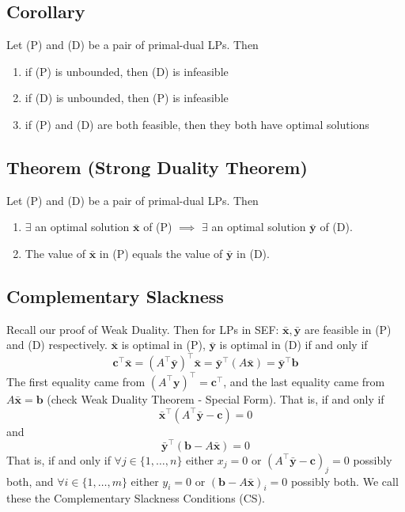\begin{thmbox}
    \subsection{Corollary}
    Let (P) and (D) be a pair of primal-dual LPs. Then
    \begin{enumerate}[(1)]
        \item if (P) is unbounded, then (D) is infeasible
        \item if (D) is unbounded, then (P) is infeasible
        \item if (P) and (D) are both feasible, then they both
        have optimal solutions
    \end{enumerate}
\end{thmbox}

\begin{thmbox}
    \subsection{Theorem (Strong Duality Theorem)}
    Let (P) and (D) be a pair of primal-dual LPs. Then
    \begin{enumerate}[(1)]
        \item $ \exists $ an optimal solution $ \bm{\bar{x}} $ of (P) $ \implies $ $\exists$ an optimal solution $ \bm{\bar{y}} $ of (D).
        \item The value of $ \bm{\bar{x}} $ in (P) equals the value of $ \bm{\bar{y}} $ in (D).
    \end{enumerate}
\end{thmbox}

\subsection{Complementary Slackness}
Recall our proof of Weak Duality. Then for LPs in SEF: 
$ \bm{\bar{x}}, \bm{\bar{y}} $ are feasible in (P) and (D) respectively.
$ \bm{\bar{x}} $ is optimal in (P), $ \bm{\bar{y}} $ is optimal in
(D)  if and only if
\[ \bm{c} ^\top \bm{\bar{x}}=(A^\top \bm{\bar{y}})^\top \bm{\bar{x}}=\bm{\bar{y}}^\top(A \bm{\bar{x}})=
\bm{\bar{y}}^\top \bm{b} \]
The first equality came from $ (A ^\top \bm{y})^\top=\bm{c}^\top $, and the
last equality came from $ A \bm{\bar{x}}=\bm{b} $ (check Weak Duality Theorem -
Special Form).
That is, if and only if
\[ \bm{\bar{x}}^\top(A ^\top \bm{\bar{y}}-\bm{c})=0 \]
and
\[ \bm{\bar{y}}^\top(\bm{b}-A \bm{\bar{x}})=0 \]
That is, if and only if $ \forall j\in \{1,\ldots,n\} $ either
$ x_j=0 $ or $ (A ^\top \bm{\bar{y}}-\bm{c})_j=0 $ possibly
both, and $ \forall i\in \{1,\ldots,m\} $ either $ y_i=0 $
or $ (\bm{b}-A \bm{\bar{x}})_i=0 $ possibly both. We call these
the Complementary Slackness Conditions (CS).

